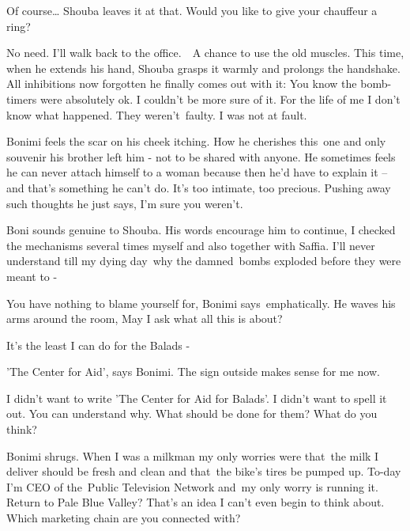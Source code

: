\documentclass[twoside,11pt]{book}
\begin{document}
{\textquotedbl}Of course{{\dots}}{\textquotedbl} Shouba leaves it at that.
{\textquotedbl}Would you like to give your chauffeur a ring?{\textquotedbl}

{\textquotedbl}No need. I'll walk back to the office.\ \ A chance to use the old muscles.{\textquotedbl} This time, when
he extends his hand, Shouba grasps it warmly and prolongs the handshake. All inhibitions now forgotten he finally comes
out with it: {\textquotedbl}You know the bomb-timers were absolutely ok. I couldn't be more sure of it. For the life of
me I don't know what happened. They weren't~faulty. I was not at fault.{\textquotedbl}

Bonimi feels the scar on his cheek itching. How he cherishes this~one and only souvenir his brother left him - not to be
shared with anyone. He sometimes feels he can never attach himself to a woman because then he'd have to explain it --
and that's something he can't do. It's too intimate, too precious. Pushing away such thoughts he just says,
{\textquotedbl}I'm sure you weren't.{\textquotedbl}

Boni sounds genuine to Shouba. His words encourage him to continue, {\textquotedbl}I checked the mechanisms several
times myself and also together with Saffia. I'll never understand till my dying
day{\ }why the damned{\ }bombs exploded
before they were meant to -{\textquotedbl}\ 

{\textquotedbl}You have nothing to blame yourself for,{\textquotedbl} Bonimi says~emphatically. He waves his arms around
the room, {\textquotedbl}May I ask what all this is about?{\textquotedbl}

{\textquotedbl}It's the least I can do for the Balads -{\textquotedbl}

{\textquotedbl}'The Center for Aid',{\textquotedbl} says Bonimi. {\textquotedbl}The sign outside makes sense for me
now.{\textquotedbl}

{\textquotedbl}I didn't want to write 'The Center for Aid for Balads'. I didn't want to spell it out. You can understand
why. What should be done for them? What do you think?{\textquotedbl}

Bonimi shrugs. {\textquotedbl}When I was a milkman my only worries were that~the milk I deliver should be fresh and
clean and that~the bike's tires be pumped up. To-day I'm CEO of the~Public Television Network and~my only worry is
running it.~ Return to Pale Blue Valley? That's an idea I can't even begin to think about. Which marketing chain are
you connected with?{\textquotedbl}\ 
\end{document}
